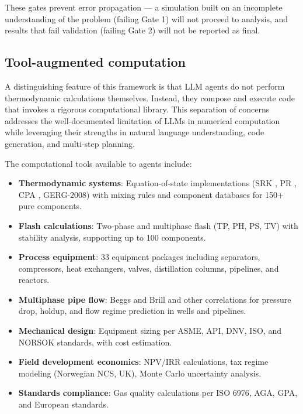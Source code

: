 \documentclass[review,3p]{elsarticle}
\begin{document}
These gates prevent error propagation --- a simulation built on an incomplete understanding of the problem (failing Gate 1) will not proceed to analysis, and results that fail validation (failing Gate 2) will not be reported as final.

\subsection{Tool-augmented computation}

A distinguishing feature of this framework is that LLM agents do not perform thermodynamic calculations themselves. Instead, they compose and execute code that invokes a rigorous computational library. This separation of concerns addresses the well-documented limitation of LLMs in numerical computation \citep{Gudipati2025} while leveraging their strengths in natural language understanding, code generation, and multi-step planning.

The computational tools available to agents include:

\begin{itemize}
  \item \textbf{Thermodynamic systems}: Equation-of-state implementations (SRK \citep{Soave1972}, PR \citep{Peng1976}, CPA \citep{Kontogeorgis1996}, GERG-2008) with mixing rules and component databases for 150+ pure components.
  \item \textbf{Flash calculations}: Two-phase and multiphase flash (TP, PH, PS, TV) with stability analysis, supporting up to 100 components.
  \item \textbf{Process equipment}: 33 equipment packages including separators, compressors, heat exchangers, valves, distillation columns, pipelines, and reactors.
  \item \textbf{Multiphase pipe flow}: Beggs and Brill \citep{BeggsBrill1973} and other correlations for pressure drop, holdup, and flow regime prediction in wells and pipelines.
  \item \textbf{Mechanical design}: Equipment sizing per ASME, API, DNV, ISO, and NORSOK standards, with cost estimation.
  \item \textbf{Field development economics}: NPV/IRR calculations, tax regime modeling (Norwegian NCS, UK), Monte Carlo uncertainty analysis.
  \item \textbf{Standards compliance}: Gas quality calculations per ISO 6976, AGA, GPA, and European standards.
\end{itemize}
\end{document}

